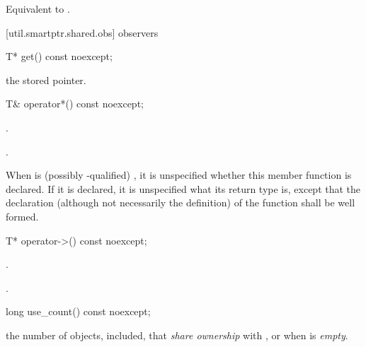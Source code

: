 \begin{itemdescr}
\pnum
\effects  Equivalent to .
\end{itemdescr}

[util.smartptr.shared.obs]{ observers}
%
%
\begin{itemdecl}
T* get() const noexcept;
\end{itemdecl}

\begin{itemdescr}
\pnum\returns  the stored pointer.
\end{itemdescr}

%
%
\begin{itemdecl}
T& operator*() const noexcept;
\end{itemdecl}

\begin{itemdescr}
\pnum\requires  {}.

\pnum\returns  {}.

\pnum\remarks When  is (possibly \cv-qualified) ,
it is unspecified whether this
member function is declared. If it is declared, it is unspecified what its
return type is, except that the declaration (although not necessarily the
definition) of the function shall be well formed.
\end{itemdescr}

%
%
\begin{itemdecl}
T* operator->() const noexcept;
\end{itemdecl}

\begin{itemdescr}
\pnum\requires  {}.

\pnum\returns  {}.
\end{itemdescr}

%
%
\begin{itemdecl}
long use_count() const noexcept;
\end{itemdecl}

\begin{itemdescr}
\pnum\returns  the number of  objects,  included,
that \textit{share ownership} with , or  when  is
\textit{empty}.
\end{itemdescr}

